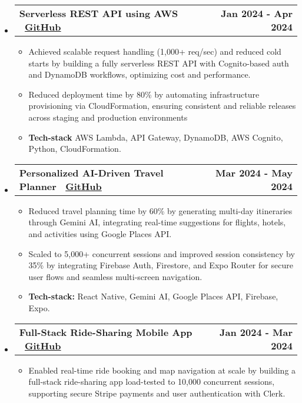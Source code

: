 \documentclass[a4paper, 10pt]{article}
\makeatletter
\newcommand{\resumeProjectHeading}[2]{
    \item
    \begin{tabular*}{\textwidth}[t]{l@{\extracolsep{\fill}}r}
      \textbf{#1} & \textbf{#2}
    \end{tabular*}
    \vspace{-15pt}
}
\makeatother
\begin{document}
    \begin{itemize}[itemsep=1pt,leftmargin=0in, label={}]
        \resumeProjectHeading{Serverless REST API using AWS \textbar\ \href{https://github.com/YashShelar007/Serverless-Architecture}{GitHub}}{Jan 2024 - Apr 2024}
        \begin{itemize}[itemsep=1pt]
            \item Achieved scalable request handling (1,000+ req/sec) and reduced cold starts by building a fully serverless REST API with Cognito-based auth and DynamoDB workflows, optimizing cost and performance. 
            
            \item Reduced deployment time by 80\% by automating infrastructure provisioning via CloudFormation, ensuring consistent and reliable releases across staging and production environments
            
            \item \textbf{Tech-stack} AWS Lambda, API Gateway, DynamoDB, AWS Cognito, Python, CloudFormation.
        \end{itemize}

        \resumeProjectHeading{Personalized AI-Driven Travel Planner \textbar\ \href{https://github.com/YashShelar007/VoyageAI}{GitHub}}{Mar 2024 - May 2024}
        \begin{itemize}[itemsep=1pt]
            \item Reduced travel planning time by 60\% by generating multi-day itineraries through Gemini AI, integrating real-time suggestions for flights, hotels, and activities using Google Places API.
            
            \item Scaled to 5,000+ concurrent sessions and improved session consistency by 35\% by integrating Firebase Auth, Firestore, and Expo Router for secure user flows and seamless multi-screen navigation. 
            
            \item \textbf{Tech-stack:} React Native, Gemini AI, Google Places API, Firebase, Expo.  
        \end{itemize}

        \resumeProjectHeading{Full-Stack Ride-Sharing Mobile App \textbar\ \href{https://github.com/YashShelar007/ZipRide}{GitHub}}{Jan 2024 - Mar 2024}
        \begin{itemize}[itemsep=1pt]
            \item Enabled real-time ride booking and map navigation at scale by building a full-stack ride-sharing app load-tested to 10,000 concurrent sessions, supporting secure Stripe payments and user authentication with Clerk. 
            

\end{itemize}
\end{itemize}
\end{document}
